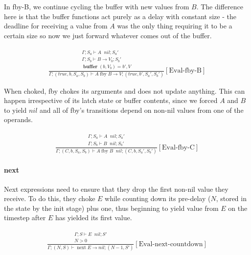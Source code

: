 \documentclass{scrartcl}
\DeclareMathOperator{\fby}{fby}
\DeclareMathOperator{\nextop}{next}
\DeclareMathOperator{\ceval}{\overset{C}{\rightarrow}}
\DeclareMathOperator{\buffer}{\mathbf{buffer}}
\begin{document}
    In fby-B, we continue cycling the buffer with new values from $B$. The difference here is that the buffer functions act purely as a delay with constant size - the deadline for receiving a value from $A$ was the only thing requiring it to be a certain size so now we just forward whatever comes out of the buffer.
    
    \begin{align*}
    \frac{
        \begin{matrix}
        \Gamma; S_a \vdash A \ceval nil; S_a' \\
        \Gamma; S_b \vdash B \rightarrow V_b; S_b' \\
        \buffer(b, V_b) = b', V
        \end{matrix}
    }{
        \Gamma; (true, b, S_a, S_b) \vdash A \fby B \rightarrow V; (true, b', S_a', S_b')
    }[\text{Eval-fby-B}]
    \end{align*}
    
    When choked, fby chokes its arguments and does not update anything. This can happen irrespective of its latch state or buffer contents, since we forced $A$ and $B$ to yield $nil$ and all of fby's transitions depend on non-nil values from one of the operands.
    
    \begin{align*}
    \frac{
        \begin{matrix}
        \Gamma; S_a \vdash A \ceval nil; S_a' \\
        \Gamma; S_b \vdash B \ceval nil; S_b'
        \end{matrix}
    }{
        \Gamma; (C, b, S_a, S_b) \vdash A \fby B \ceval nil; (C, b, S_a', S_b')
    }[\text{Eval-fby-C}]
    \end{align*}
    
    \paragraph{next}
    
    Next expressions need to ensure that they drop the first non-nil value they receive. To do this, they choke $E$ while counting down its pre-delay ($N$, stored in the state by the init stage) plus one, thus beginning to yield value from $E$ on the timestep after $E$ has yielded its first value.
    
    \begin{align*}
    \frac{
        \begin{matrix}
        \Gamma; S \vdash E \ceval nil; S' \\
        N > 0
        \end{matrix}
    }{
        \Gamma; (N, S) \vdash \nextop E \rightarrow nil; (N-1, S')
    }[\text{Eval-next-countdown}]
    \end{align*}
    
\end{document}
